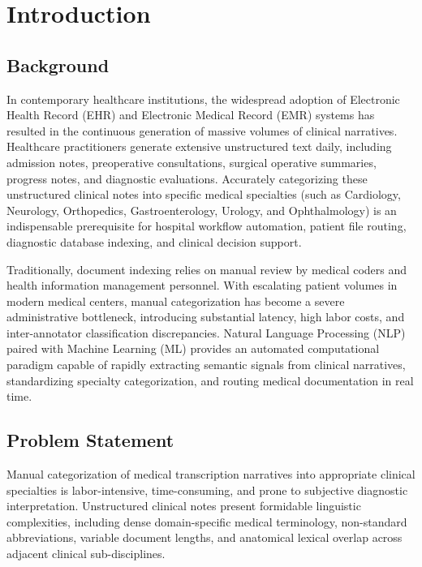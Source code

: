 \section{Introduction}

\subsection{Background}
In contemporary healthcare institutions, the widespread adoption of Electronic Health Record (EHR) and Electronic Medical Record (EMR) systems has resulted in the continuous generation of massive volumes of clinical narratives. Healthcare practitioners generate extensive unstructured text daily, including admission notes, preoperative consultations, surgical operative summaries, progress notes, and diagnostic evaluations. Accurately categorizing these unstructured clinical notes into specific medical specialties (such as Cardiology, Neurology, Orthopedics, Gastroenterology, Urology, and Ophthalmology) is an indispensable prerequisite for hospital workflow automation, patient file routing, diagnostic database indexing, and clinical decision support.

Traditionally, document indexing relies on manual review by medical coders and health information management personnel. With escalating patient volumes in modern medical centers, manual categorization has become a severe administrative bottleneck, introducing substantial latency, high labor costs, and inter-annotator classification discrepancies. Natural Language Processing (NLP) paired with Machine Learning (ML) provides an automated computational paradigm capable of rapidly extracting semantic signals from clinical narratives, standardizing specialty categorization, and routing medical documentation in real time.

\subsection{Problem Statement}
Manual categorization of medical transcription narratives into appropriate clinical specialties is labor-intensive, time-consuming, and prone to subjective diagnostic interpretation. Unstructured clinical notes present formidable linguistic complexities, including dense domain-specific medical terminology, non-standard abbreviations, variable document lengths, and anatomical lexical overlap across adjacent clinical sub-disciplines.

